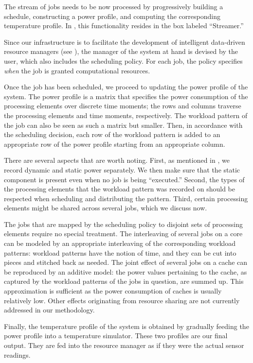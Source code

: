 The stream of jobs needs to be now processed by progressively building a
schedule, constructing a power profile, and computing the corresponding
temperature profile. In , this functionality resides in the
box labeled ``Streamer.''

Since our infrastructure is to facilitate the development of intelligent
data-driven resource managers (see ), the manager of the system at
hand is devised by the user, which also includes the scheduling policy. For each
job, the policy specifies \emph{when} the job is granted computational
resources.

Once the job has been scheduled, we proceed to updating the power profile of the
system. The power profile is a matrix that specifies the power consumption of
the processing elements over discrete time moments; the rows and columns
traverse the processing elements and time moments, respectively. The workload
pattern of the job can also be seen as such a matrix but smaller. Then, in
accordance with the scheduling decision, each row of the workload pattern is
added to an appropriate row of the power profile starting from an appropriate
column.

There are several aspects that are worth noting. First, as mentioned in
, we record dynamic and static power separately. We then make
sure that the static component is present even when no job is being
``executed.'' Second, the types of the processing elements that the workload
pattern was recorded on should be respected when scheduling and distributing the
pattern. Third, certain processing elements might be shared across several jobs,
which we discuss now.

The jobs that are mapped by the scheduling policy to disjoint sets of processing
elements require no special treatment. The interleaving of several jobs on a
core can be modeled by an appropriate interleaving of the corresponding workload
patterns: workload patterns have the notion of time, and they can be cut into
pieces and stitched back as needed. The joint effect of several jobs on a cache
can be reproduced by an additive model: the power values pertaining to the
cache, as captured by the workload patterns of the jobs in question, are summed
up. This approximation is sufficient as the power consumption of caches is
usually relatively low. Other effects originating from resource sharing are not
currently addressed in our methodology.

Finally, the temperature profile of the system is obtained by gradually feeding
the power profile into a temperature simulator. These two profiles are our final
output. They are fed into the resource manager as if they were the actual sensor
readings.
